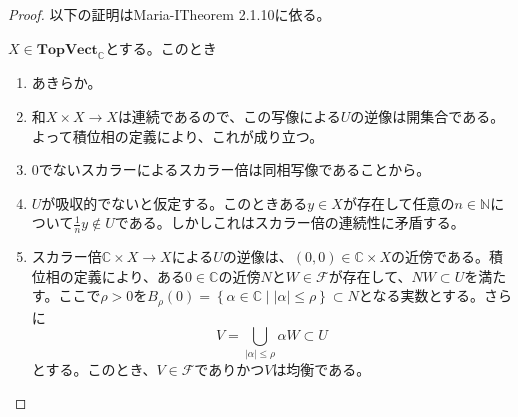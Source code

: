 ﻿\documentclass[12pt]{jsarticle}
\newcommand{\N}{\mathbb{N}}
\newcommand{\C}{\mathbb{C}}
\newcommand{\TopVect}{\textbf{TopVect}_{\C}}
\newcommand{\F}{\mathcal{F}}%
\newcommand{\setmid}[2]{\left\{ #1 \mathrel{} \middle| \mathrel{} #2 \right\}}%
\newcommand{\abs}[1]{\left \lvert #1 \right \rvert}%
\theoremstyle{definition}%
\begin{document}
\begin{proof}
  以下の証明はMaria-I\cite{Maria-I}Theorem 2.1.10に依る。

  $X \in \TopVect$とする。このとき
\begin{enumerate}
  \item あきらか。
  \item 和$X \times X \to X$は連続であるので、この写像による$U$の逆像は開集合である。よって積位相の定義により、これが成り立つ。
  \item $0$でないスカラーによるスカラー倍は同相写像であることから。
  \item $U$が吸収的でないと仮定する。このときある$y \in X$が存在して任意の$n \in \N$について$\frac{1}{n}y \not\in U$である。しかしこれはスカラー倍の連続性に矛盾する。
  \item スカラー倍$\C \times X \to X$による$U$の逆像は、$(0,0) \in \C \times X$の近傍である。積位相の定義により、ある$0 \in \C$の近傍$N$と$W \in \F$が存在して、$NW \subset U$を満たす。ここで$\rho > 0$を$B_{\rho}(0) = \setmid{\alpha \in \C}{\abs{\alpha} \leq \rho} \subset N$となる実数とする。さらに
  \[
  V = \bigcup_{\abs{\alpha} \leq \rho} \alpha W \subset U
  \]
とする。このとき、$V \in \F$でありかつ$V$は均衡である。
\end{enumerate}


\end{proof}
\end{document}
